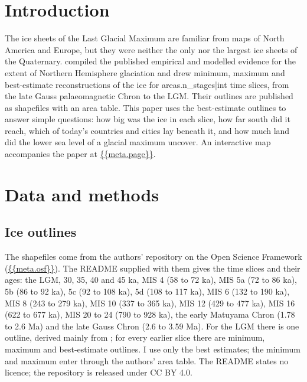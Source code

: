 \documentclass[11pt,a4paper]{article}
\begin{document}
\section{Introduction}
The ice sheets of the Last Glacial Maximum are familiar from maps of North America and Europe, but they were neither the only nor the largest ice sheets of the Quaternary. \citet{batchelor} compiled the published empirical and modelled evidence for the extent of Northern Hemisphere glaciation and drew minimum, maximum and best-estimate reconstructions of the ice for {{areas.n_stages|int}} time slices, from the late Gauss palaeomagnetic Chron to the LGM. Their outlines are published as shapefiles with an area table. This paper uses the best-estimate outlines to answer simple questions: how big was the ice in each slice, how far south did it reach, which of today's countries and cities lay beneath it, and how much land did the lower sea level of a glacial maximum uncover. An interactive map accompanies the paper at \url{{{meta.page}}}.

\section{Data and methods}
\subsection{Ice outlines}
The shapefiles come from the authors' repository on the Open Science Framework (\url{{{meta.osf}}}). The README supplied with them gives the time slices and their ages: the LGM, 30, 35, 40 and 45 ka, MIS 4 (58 to 72 ka), MIS 5a (72 to 86 ka), 5b (86 to 92 ka), 5c (92 to 108 ka), 5d (108 to 117 ka), MIS 6 (132 to 190 ka), MIS 8 (243 to 279 ka), MIS 10 (337 to 365 ka), MIS 12 (429 to 477 ka), MIS 16 (622 to 677 ka), MIS 20 to 24 (790 to 928 ka), the early Matuyama Chron (1.78 to 2.6 Ma) and the late Gauss Chron (2.6 to 3.59 Ma). For the LGM there is one outline, derived mainly from \citet{ehlers}; for every earlier slice there are minimum, maximum and best-estimate outlines. I use only the best estimates; the minimum and maximum enter through the authors' area table. The README states no licence; the repository is released under CC BY 4.0.
\end{document}
